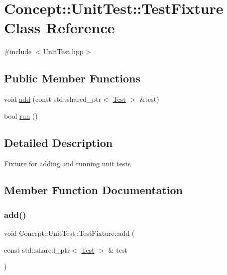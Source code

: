 \hypertarget{class_concept_1_1_unit_test_1_1_test_fixture}{}\section{Concept\+::Unit\+Test\+::Test\+Fixture Class Reference}
\label{class_concept_1_1_unit_test_1_1_test_fixture}


{\ttfamily \#include $<$Unit\+Test.\+hpp$>$}

\subsection*{Public Member Functions}
\begin{DoxyCompactItemize}
\item 
void \mbox{\hyperlink{class_concept_1_1_unit_test_1_1_test_fixture_a374560cf189317faf4937ef4484f0501}{add}} (const std\+::shared\+\_\+ptr$<$ \mbox{\hyperlink{class_concept_1_1_unit_test_1_1_test}{Test}} $>$ \&test)
\item 
bool \mbox{\hyperlink{class_concept_1_1_unit_test_1_1_test_fixture_a6191716d38524a4acbc287a4b22ba25a}{run}} ()
\end{DoxyCompactItemize}


\subsection{Detailed Description}
Fixture for adding and running unit tests 

\subsection{Member Function Documentation}
\mbox{\label{class_concept_1_1_unit_test_1_1_test_fixture_a374560cf189317faf4937ef4484f0501}} 
\subsubsection{\texorpdfstring{add()}{add()}}
{\footnotesize\ttfamily void Concept\+::\+Unit\+Test\+::\+Test\+Fixture\+::add (\begin{DoxyParamCaption}\item[{const std\+::shared\+\_\+ptr$<$ \mbox{\hyperlink{class_concept_1_1_unit_test_1_1_test}{Test}} $>$ \&}]{test }\end{DoxyParamCaption})\hspace{0.3cm}{\ttfamily [inline]}}

